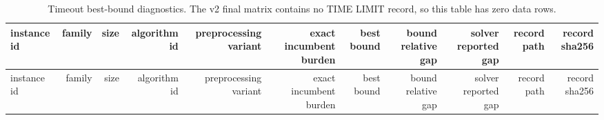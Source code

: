 {\footnotesize
\begin{longtable}{lrrrrrrrrrr}
\caption{Timeout best-bound diagnostics. The v2 final matrix contains no TIME LIMIT record, so this table has zero data rows.}\label{tab:aor-timeout-bounds}\\
\toprule
instance id & family & size & algorithm id & preprocessing variant & exact incumbent burden & best bound & bound relative gap & solver reported gap & record path & record sha256 \\
\midrule
\endfirsthead
\toprule
instance id & family & size & algorithm id & preprocessing variant & exact incumbent burden & best bound & bound relative gap & solver reported gap & record path & record sha256 \\
\midrule
\endhead
\bottomrule
\end{longtable}
}
